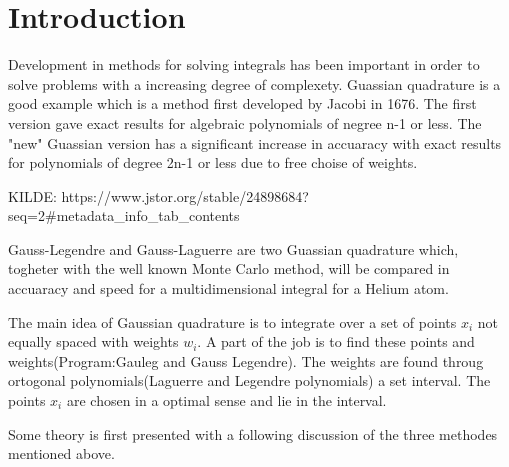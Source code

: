 \documentclass[../main.tex]{subfiles}
\begin{document}
\section{Introduction} \label{sec:intro}
Development in methods for solving integrals has been important in order to solve problems with a increasing degree of complexety. Guassian quadrature is a good example which is a method first developed by Jacobi in 1676. The first version gave exact results for algebraic polynomials of negree n-1 or less. The "new" Guassian version has a significant increase in accuaracy with exact results for polynomials of degree 2n-1 or less due to free choise of weights.


KILDE:
https://www.jstor.org/stable/24898684?seq=2#metadata_info_tab_contents

Gauss-Legendre and Gauss-Laguerre are two Guassian quadrature which, togheter with the well known Monte Carlo method, will be compared in accuaracy and speed for a multidimensional integral for a Helium atom.

The main idea of Gaussian quadrature is to integrate over a set of points $x_i$ not equally spaced with weights $w_i$. A part of the job is to find these points and weights(Program:Gauleg and Gauss Legendre). The weights are found throug ortogonal polynomials(Laguerre and Legendre polynomials) a set interval. The points $x_i$ are chosen in a optimal sense and lie in the interval.

Some theory is first presented with a following discussion of the three methodes mentioned above.
\end{document}
